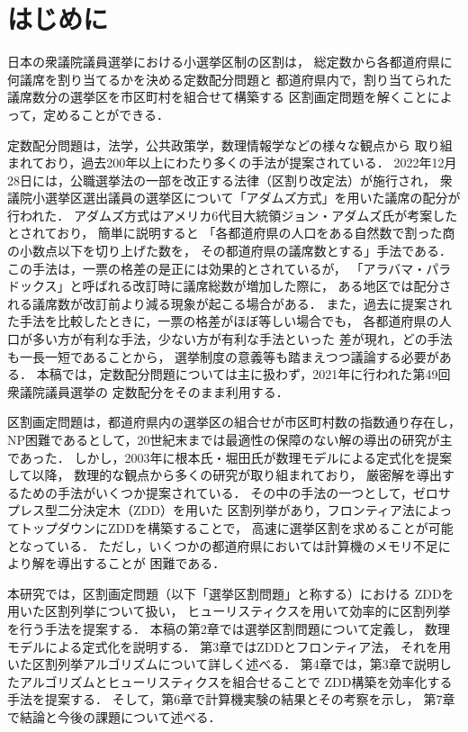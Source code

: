 \chapter{はじめに} \label{chapter:1}
日本の衆議院議員選挙における小選挙区制の区割は，
総定数から各都道府県に何議席を割り当てるかを決める定数配分問題と
都道府県内で，割り当てられた議席数分の選挙区を市区町村を組合せて構築する
区割画定問題を解くことによって，定めることができる．

定数配分問題は，法学，公共政策学，数理情報学などの様々な観点から
取り組まれており，過去200年以上にわたり多くの手法が提案されている．
2022年12月28日には，公職選挙法の一部を改正する法律（区割り改定法）が施行され，
衆議院小選挙区選出議員の選挙区について「アダムズ方式」を用いた議席の配分が行われた．
アダムズ方式はアメリカ6代目大統領ジョン・アダムズ氏が考案したとされており，
簡単に説明すると
「各都道府県の人口をある自然数で割った商の小数点以下を切り上げた数を，
その都道府県の議席数とする」手法である．
この手法は，一票の格差の是正には効果的とされているが，
「アラバマ・パラドックス」と呼ばれる改訂時に議席総数が増加した際に，
ある地区では配分される議席数が改訂前より減る現象が起こる場合がある．
また，過去に提案された手法を比較したときに，一票の格差がほぼ等しい場合でも，
各都道府県の人口が多い方が有利な手法，少ない方が有利な手法といった
差が現れ，どの手法も一長一短であることから，
選挙制度の意義等も踏まえつつ議論する必要がある．
本稿では，定数配分問題については主に扱わず，2021年に行われた第49回衆議院議員選挙の
定数配分をそのまま利用する．

区割画定問題は，都道府県内の選挙区の組合せが市区町村数の指数通り存在し，
NP困難であるとして，20世紀末までは最適性の保障のない解の導出の研究が主であった．
しかし，2003年に根本氏・堀田氏が数理モデルによる定式化を提案して以降，
数理的な観点から多くの研究が取り組まれており，
厳密解を導出するための手法がいくつか提案されている．
その中の手法の一つとして，ゼロサプレス型二分決定木（ZDD）を用いた
区割列挙があり，フロンティア法によってトップダウンにZDDを構築することで，
高速に選挙区割を求めることが可能となっている．
ただし，いくつかの都道府県においては計算機のメモリ不足により解を導出することが
困難である．

本研究では，区割画定問題（以下「選挙区割問題」と称する）における
ZDDを用いた区割列挙について扱い，
ヒューリスティクスを用いて効率的に区割列挙を行う手法を提案する．
本稿の第2章では選挙区割問題について定義し，
数理モデルによる定式化を説明する．
第3章ではZDDとフロンティア法，
それを用いた区割列挙アルゴリズムについて詳しく述べる．
第4章では，第3章で説明したアルゴリズムとヒューリスティクスを組合せることで
ZDD構築を効率化する手法を提案する．
そして，第6章で計算機実験の結果とその考察を示し，
第7章で結論と今後の課題について述べる．
